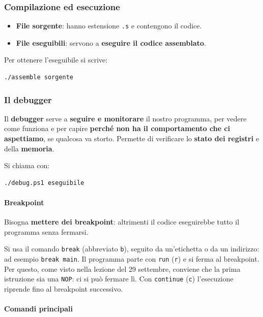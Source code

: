 \documentclass[11pt,a4paper]{article}
\begin{document}
\subsubsection*{Compilazione ed esecuzione}

\begin{itemize}[leftmargin=*]
  \item \textbf{File sorgente}: hanno estensione \texttt{.s} e contengono il codice.
  \item \textbf{File eseguibili}: servono a \textbf{eseguire il codice assemblato}.
\end{itemize}

Per ottenere l'eseguibile si scrive:
\begin{lstlisting}
./assemble sorgente
\end{lstlisting}

\subsubsection*{Il debugger}

Il \textbf{debugger} serve a \textbf{seguire e monitorare} il nostro programma, per vedere come funziona e per capire \textbf{perché non ha il comportamento che ci aspettiamo}, se qualcosa va storto. Permette di verificare lo \textbf{stato dei registri} e della \textbf{memoria}.

Si chiama con:
\begin{lstlisting}
./debug.ps1 eseguibile
\end{lstlisting}

\paragraph*{Breakpoint}

Bisogna \textbf{mettere dei breakpoint}: altrimenti il codice eseguirebbe tutto il programma senza fermarsi.

\begin{integrazione}
Si usa il comando \texttt{break} (abbreviato \texttt{b}), seguito da un'etichetta o da un indirizzo: ad esempio \texttt{break main}. Il programma parte con \texttt{run} (\texttt{r}) e si ferma al breakpoint. Per questo, come visto nella lezione del 29 settembre, conviene che la prima istruzione sia una \texttt{NOP}: ci si può fermare lì. Con \texttt{continue} (\texttt{c}) l'esecuzione riprende fino al breakpoint successivo.
\end{integrazione}

\paragraph*{Comandi principali}
\end{document}
